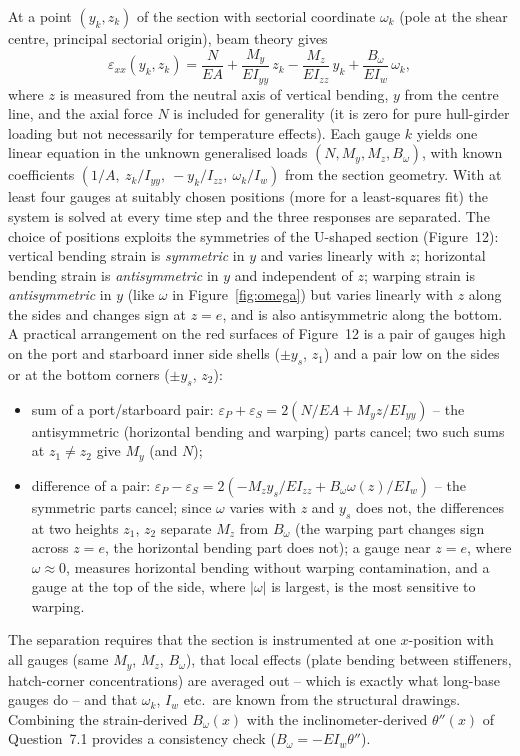 \bigskip
At a point $(y_k,z_k)$ of the section with sectorial coordinate $\omega_k$ (pole at the shear centre, principal sectorial origin), beam theory gives
\begin{equation}
  \varepsilon_{xx}(y_k,z_k)=\frac{N}{EA}+\frac{M_y}{EI_{yy}}\,z_k-\frac{M_z}{EI_{zz}}\,y_k+\frac{B_\omega}{EI_w}\,\omega_k ,
  \label{eq:strainsep}
\end{equation}
where $z$ is measured from the neutral axis of vertical bending, $y$ from the centre line, and the axial force $N$ is included for generality (it is zero for pure hull-girder loading but not necessarily for temperature effects). Each gauge $k$ yields one linear equation in the unknown generalised loads $(N,M_y,M_z,B_\omega)$, with known coefficients $(1/A,\ z_k/I_{yy},\ -y_k/I_{zz},\ \omega_k/I_w)$ from the section geometry. With at least four gauges at suitably chosen positions (more for a least-squares fit) the system is solved at every time step and the three responses are separated. The choice of positions exploits the symmetries of the U-shaped section (Figure~12): vertical bending strain is \emph{symmetric} in $y$ and varies linearly with $z$; horizontal bending strain is \emph{antisymmetric} in $y$ and independent of $z$; warping strain is \emph{antisymmetric} in $y$ (like $\omega$ in Figure~\ref{fig:omega}) but varies linearly with $z$ along the sides and changes sign at $z=e$, and is also antisymmetric along the bottom. A practical arrangement on the red surfaces of Figure~12 is a pair of gauges high on the port and starboard inner side shells ($\pm y_s$, $z_1$) and a pair low on the sides or at the bottom corners ($\pm y_s$, $z_2$):
\begin{itemize}
  \item sum of a port/starboard pair: $\varepsilon_P+\varepsilon_S=2\left(N/EA+M_yz/EI_{yy}\right)$ -- the antisymmetric (horizontal bending and warping) parts cancel; two such sums at $z_1\ne z_2$ give $M_y$ (and $N$);
  \item difference of a pair: $\varepsilon_P-\varepsilon_S=2\left(-M_zy_s/EI_{zz}+B_\omega\omega(z)/EI_w\right)$ -- the symmetric parts cancel; since $\omega$ varies with $z$ and $y_s$ does not, the differences at two heights $z_1$, $z_2$ separate $M_z$ from $B_\omega$ (the warping part changes sign across $z=e$, the horizontal bending part does not); a gauge near $z=e$, where $\omega\approx0$, measures horizontal bending without warping contamination, and a gauge at the top of the side, where $|\omega|$ is largest, is the most sensitive to warping.
\end{itemize}
The separation requires that the section is instrumented at one $x$-position with all gauges (same $M_y$, $M_z$, $B_\omega$), that local effects (plate bending between stiffeners, hatch-corner concentrations) are averaged out -- which is exactly what long-base gauges do -- and that $\omega_k$, $I_w$ etc.\ are known from the structural drawings. Combining the strain-derived $B_\omega(x)$ with the inclinometer-derived $\theta''(x)$ of Question~7.1 provides a consistency check ($B_\omega=-EI_w\theta''$).

